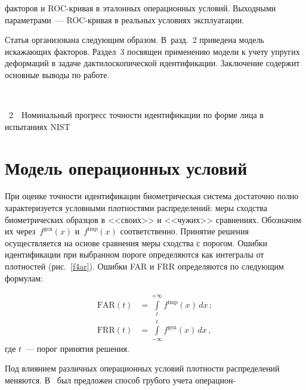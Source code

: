 \begin{multicols}{2}

\noindent
 факторов и ROC-кривая в эталонных операционных условий. 
Выходными параметрами~--- ROC-кри\-вая в реальных условиях эксплуатации.


  Статья организована следующим образом. В~разд.~2 приведена модель искажающих факторов. 
Раздел~3 посвящен применению модели к учету упругих деформаций в задаче 
дактилоскопической идентификации. Заключение содержит основные выводы по работе.

\noindent
\begin{center} %
\vspace*{3pt}
\mbox{%
\epsfxsize=79.993mm
}
\end{center}
\vspace*{3pt}
{{\figurename~2}\ \ \small{Номинальный прогресс точности идентификации по форме лица в испытаниях NIST}}



\addtocounter{figure}{1}

\section{Модель операционных условий}

  При оценке точности идентификации био\-мет\-ри\-че\-ская система достаточно полно 
характеризуется условными плотностями распределений: меры сходства биометрических 
образцов в <<своих>> и <<чужих>> сравнениях. Обозначим их через~$f^{\mathrm{gen}}(x)$ 
и~$f^{\mathrm{imp}}(x)$ соответственно. Принятие решения осуществляется на основе сравнения меры 
сходства с порогом. Ошибки идентификации при выбранном пороге определяются как интегралы 
от плотностей (рис.~\ref{f4ar}). Ошибки FAR и FRR определяются по следующим формулам:

\vspace*{-3pt}

\noindent
  \begin{align*}
  \mathrm{FAR}(t) & = \int\limits_t^{+\infty} f^{\mathrm{imp}}(x)\,dx\,;\\
  \mathrm{FRR}(t) & = \int\limits_{-\infty}^{t} f^{\mathrm{gen}}(x)\,dx\,,
  \end{align*}
где $t$~--- порог принятия решения.



  Под влиянием различных операционных условий плотности распределений меняются. 
В~\cite{6ar} был предложен способ грубого учета операцион-\linebreak\vspace*{-12pt}
\pagebreak

\end{multicols}

